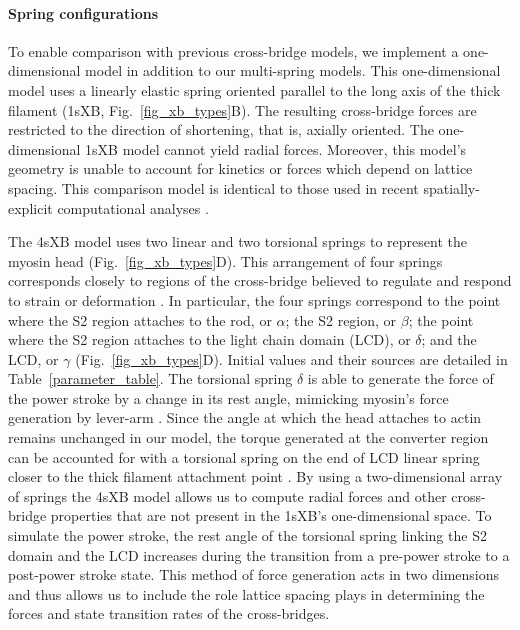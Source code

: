 \documentclass[11pt,titlepage]{article}
\begin{document}
\paragraph{Spring configurations} %
To enable comparison with previous cross-bridge models, we implement a one-dimensional model in addition to our multi-spring models. 
This one-dimensional model uses a linearly elastic spring oriented parallel to the long axis of the thick filament (1sXB, Fig.~\ref{fig_xb_types}B).  
The resulting cross-bridge forces are restricted to the direction of shortening, that is, axially oriented. 
The one-dimensional 1sXB model cannot yield radial forces.
Moreover, this model's geometry is unable to account for kinetics or forces which depend on lattice spacing. 
This comparison model is identical to those used in recent spatially-explicit computational analyses \citep{Daniel1998, Chase2004, Tanner2007}. 

The 4sXB model uses two linear and two torsional springs to represent the myosin head (Fig.~\ref{fig_xb_types}D).
This arrangement of four springs corresponds closely to regions of the cross-bridge believed to regulate and respond to strain or deformation \citep{Houdusse2001}.
In particular, the four springs correspond to the point where the S2 region attaches to the rod, or $\alpha$; the S2 region, or $\beta$; the point where the S2 region attaches to the light chain domain (LCD), or $\delta$; and the LCD, or $\gamma$ (Fig.~\ref{fig_xb_types}D).
Initial values and their sources are detailed in Table~\ref{parameter_table}. 
The torsional spring $\delta$ is able to generate the force of the power stroke by a change in its rest angle, mimicking myosin's force generation by lever-arm \citep{Houdusse2000, Houdusse2001}. 
Since the angle at which the head attaches to actin remains unchanged in our model, the torque generated at the converter region can be accounted for with a torsional spring on the end of LCD linear spring closer to the thick filament attachment point \citep{Houdusse2000}. 
By using a two-dimensional array of springs the 4sXB model allows us to compute radial forces and other cross-bridge properties that are not present in the 1sXB's one-dimensional space. 
To simulate the power stroke, the rest angle of the torsional spring linking the S2 domain and the LCD increases during the transition from a pre-power stroke to a post-power stroke state.
This method of force generation acts in two dimensions and thus allows us to include the role lattice spacing plays in determining the forces and state transition rates of the cross-bridges. 
\end{document}
